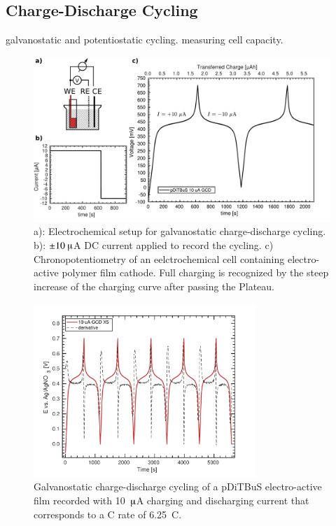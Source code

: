 \subsection{Charge-Discharge Cycling}
\label{sec:echem_charging}
galvanostatic and potentiostatic cycling. measuring cell capacity.


\begin{figure}[h]
\center
	\includegraphics[width=1\textwidth]{./electrochemistry/figures/GCD_principle_pDiTBuS.pdf}
	\caption{a): Electrochemical setup for galvanostatic charge-discharge cycling. b): $\pm10~\muup$A DC current applied to record the cycling. c) Chronopotentiometry of an eelctrochemical cell containing electro-active polymer film cathode. Full charging is recognized by the steep increase of the charging curve after passing the Plateau.}
	\label{fig:GCD}
\end{figure}



\begin{figure}[h]
\center
	\includegraphics[width=0.75\textwidth]{./electrochemistry/figures/GCD_pDiTBuS.pdf}
	\caption{Galvanostatic charge-discharge cycling of a pDiTBuS electro-active film recorded with 10~$\muup$A charging and discharging current that corresponds to a C rate of 6.25~C.}
	\label{fig:GCD_DiTBuS}
\end{figure}



